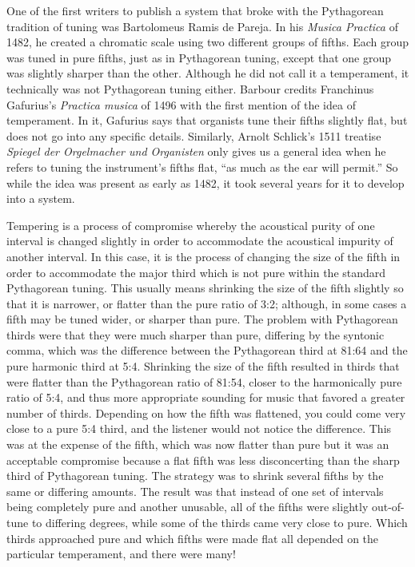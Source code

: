 One of the first writers to publish a system that broke with the Pythagorean
tradition of tuning was Bartolomeus Ramis de Pareja.  In his \textit{Musica Practica} of
1482, he created a chromatic scale using two different groups of fifths.  Each group was
tuned in pure fifths, just as in Pythagorean tuning, except that one group was slightly
sharper than the other. \autocite[88]{MB:1}  Although he did not call it a temperament, it
technically was not Pythagorean tuning either.  Barbour credits Franchinus Gafurius's
\textit{Practica musica} of 1496 with the first mention of the idea of temperament.  In
it, Gafurius says that organists tune their fifths slightly flat, but does not go into any
specific details.\autocite[25]{MB:1} Similarly, Arnolt Schlick's 1511 treatise
\textit{Spiegel der Orgelmacher und Organisten} only gives us a general idea when he
refers to tuning the instrument's fifths flat, ``as much as the ear will permit.''
\autocite[202]{RR:1}  So while the idea was present as early as 1482, it took
several years for it to develop into a system.

Tempering is a process of compromise whereby the acoustical purity of one interval is
changed slightly in order to accommodate the acoustical impurity of another interval.
In this case, it is the process of changing the size of the fifth in order to
accommodate the major third which is not pure within the standard Pythagorean tuning.
This usually means shrinking the size of the fifth slightly so that it is narrower, or
flatter than the pure ratio of 3:2; although, in some cases a fifth may be tuned wider, or
sharper than pure. The problem with Pythagorean thirds were that they were much sharper
than pure, differing by the syntonic comma, which was the difference between the
Pythagorean third at 81:64 and the pure harmonic third at 5:4. Shrinking the size of the
fifth resulted in thirds that were flatter than the Pythagorean ratio of 81:54, closer to
the harmonically pure ratio of 5:4, and thus more appropriate sounding for music that
favored a greater number of thirds. Depending on how the fifth was flattened, you could
come very close to a pure 5:4 third, and the listener would not notice the
difference.  This was at the expense of the fifth, which was now flatter than pure but it
was an acceptable compromise because a flat fifth was less disconcerting than the
sharp third of Pythagorean tuning.  The strategy was to shrink several fifths by the same
or differing amounts. The result was that instead of one set of intervals being completely
pure and another unusable, all of the fifths were slightly
out-of-tune to differing degrees, while some of the thirds came very close to pure. Which
thirds approached pure and which fifths were made flat all depended on the particular
temperament, and there were many!

